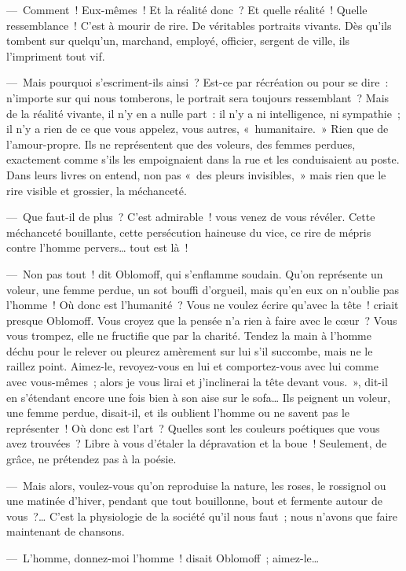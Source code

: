 \documentclass[french,twoside]{book} %
\begin{document}
— Comment ! Eux-mêmes ! Et la réalité donc ? Et quelle réalité ! Quelle ressemblance ! C’est à mourir de rire. De véritables portraits vivants. Dès qu’ils tombent sur quelqu’un, marchand, employé, officier, sergent de ville, ils l’impriment tout vif.\par
— Mais pourquoi s’escriment-ils ainsi ? Est-ce par récréation ou pour se dire : n’importe sur qui nous tomberons, le portrait sera toujours ressemblant ? Mais de la réalité vivante, il n’y en a nulle part : il n’y a ni intelligence, ni sympathie ; il n’y a rien de ce que vous appelez, vous autres, « humanitaire. » Rien que de l’amour-propre. Ils ne représentent que des voleurs, des femmes perdues, exactement comme s’ils les empoignaient dans la rue et les conduisaient au poste. Dans leurs livres on entend, non pas « des pleurs invisibles, » mais rien que le rire visible et grossier, la méchanceté.\par
— Que faut-il de plus ? C’est admirable ! vous venez de vous révéler. Cette méchanceté bouillante, cette persécution haineuse du vice, ce rire de mépris contre l’homme pervers… tout est là !\par
— Non pas tout ! dit Oblomoff, qui s’enflamme soudain. Qu’on représente un voleur, une femme perdue, un sot bouffi d’orgueil, mais qu’en eux on n’oublie pas l’homme ! Où donc est l’humanité ? Vous ne voulez écrire qu’avec la tête ! criait presque Oblomoff. Vous croyez que la pensée n’a rien à faire avec le cœur ? Vous vous trompez, elle ne fructifie que par la charité. Tendez la main à l’homme déchu pour le relever ou pleurez amèrement sur lui s’il succombe, mais ne le raillez point. Aimez-le, revoyez-vous en lui et comportez-vous avec lui comme avec vous-mêmes ; alors je vous lirai et j’inclinerai la tête devant vous. », dit-il en s’étendant encore une fois bien à son aise sur le sofa… Ils peignent un voleur, une femme perdue, disait-il, et ils oublient l’homme ou ne savent pas le représenter ! Où donc est l’art ? Quelles sont les couleurs poétiques que vous avez trouvées ? Libre à vous d’étaler la dépravation et la boue ! Seulement, de grâce, ne prétendez pas à la poésie.\par
— Mais alors, voulez-vous qu’on reproduise la nature, les roses, le rossignol ou une matinée d’hiver, pendant que tout bouillonne, bout et fermente autour de vous ?… C’est la physiologie de la société qu’il nous faut ; nous n’avons que faire maintenant de chansons.\par
— L’homme, donnez-moi l’homme ! disait Oblomoff ; aimez-le…\par
\end{document}
